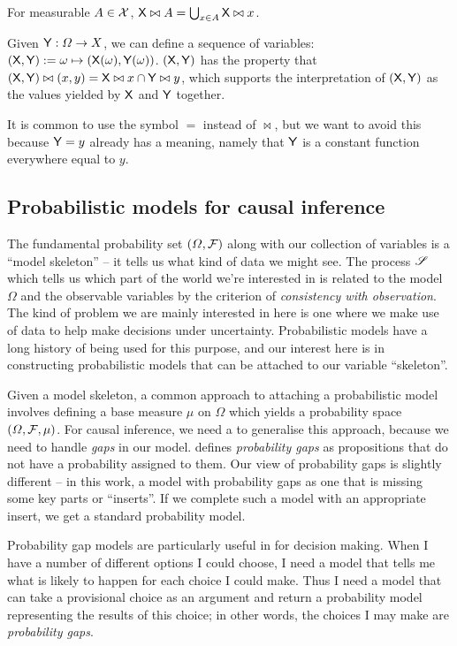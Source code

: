 For measurable $A\in \mathcal{X}$, $\mathsf{X}\bowtie A=\bigcup_{x\in A} \mathsf{X}\bowtie x$. 

Given $\mathsf{Y}:\Omega\to X$, we can define a sequence of variables: $(\mathsf{X},\mathsf{Y}):=\omega\mapsto (\mathsf{X}(\omega),\mathsf{Y}(\omega))$. $(\mathsf{X},\mathsf{Y})$ has the property that $(\mathsf{X},\mathsf{Y})\bowtie (x,y)= \mathsf{X}\bowtie x\cap \mathsf{Y}\bowtie y$, which supports the interpretation of $(\mathsf{X},\mathsf{Y})$ as the values yielded by $\mathsf{X}$ and $\mathsf{Y}$ together.

It is common to use the symbol $=$ instead of $\bowtie$, but we want to avoid this because $\mathsf{Y}=y$ already has a meaning, namely that $\mathsf{Y}$ is a constant function everywhere equal to $y$. 

\subsection{Probabilistic models for causal inference}

The fundamental probability set $(\Omega,\mathcal{F})$ along with our collection of variables is a ``model skeleton'' -- it tells us what kind of data we might see. The process $\mathscr{S}$ which tells us which part of the world we're interested in is related to the model $\Omega$ and the observable variables by the criterion of \emph{consistency with observation}. The kind of problem we are mainly interested in here is one where we make use of data to help make decisions under uncertainty. Probabilistic models have a long history of being used for this purpose, and our interest here is in constructing probabilistic models that can be attached to our variable ``skeleton''. 

Given a model skeleton, a common approach to attaching a probabilistic model involves defining a base measure $\mu$ on $\Omega$ which yields a probability space $(\Omega,\mathcal{F},\mu)$. For causal inference, we need a to generalise this approach, because we need to handle \emph{gaps} in our model. \citet{hajek_what_2003} defines \emph{probability gaps} as propositions that do not have a probability assigned to them. Our view of probability gaps is slightly different -- in this work, a model with probability gaps as one that is missing some key parts or ``inserts''. If we complete such a model with an appropriate insert, we get a standard probability model.

Probability gap models are particularly useful in for decision making. When I have a number of different options I could choose, I need a model that tells me what is likely to happen for each choice I could make. Thus I need a model that can take a provisional choice as an argument and return a probability model representing the results of this choice; in other words, the choices I may make are \emph{probability gaps}.


